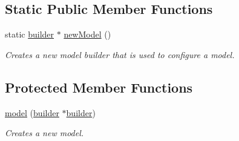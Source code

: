 \subsection*{Static Public Member Functions}
\begin{DoxyCompactItemize}
\item 
static \hyperlink{classflounder_1_1model_1_1builder}{builder} $\ast$ \hyperlink{classflounder_1_1model_a55bec80a4092dbe35c319c49d1d50ed8}{new\+Model} ()
\begin{DoxyCompactList}\small\item\em Creates a new model builder that is used to configure a model. \end{DoxyCompactList}\end{DoxyCompactItemize}
\subsection*{Protected Member Functions}
\begin{DoxyCompactItemize}
\item 
\hyperlink{classflounder_1_1model_a6a27604e53fce127b6f6da4fb4d74972}{model} (\hyperlink{classflounder_1_1model_1_1builder}{builder} $\ast$\hyperlink{classflounder_1_1model_1_1builder}{builder})
\begin{DoxyCompactList}\small\item\em Creates a new model. \end{DoxyCompactList}\end{DoxyCompactItemize}
